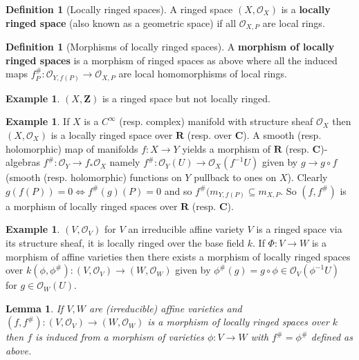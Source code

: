 \documentclass[10pt,]{book}
\newcommand{\terminology}[1]{\textbf{#1}}
\theoremstyle{plain}
\newtheorem{lemma}[theorem]{Lemma}
\theoremstyle{definition}
\newtheorem{definition}[theorem]{Definition}
\newtheorem{example}[theorem]{Example}
\newcommand{\CC}{\mathbf{C}}
\newcommand{\RR}{\mathbf{R}}
\newcommand{\ZZ}{\mathbf{Z}}
\newcommand{\cO}{\mathcal{O}}
\begin{document}
\begin{definition}[Locally ringed spaces]\label{definition-11}
A ringed space \((X, \cO_X)\) is a \terminology{locally ringed space} (also known as a geometric space) if all \(\cO_{X,P}\) are local rings.\end{definition}
\begin{definition}[Morphisms of locally ringed spaces]\label{definition-12}
A \terminology{morphism of locally ringed spaces} is a morphism of ringed spaces as above where all the induced maps \(f_P^\#\colon \cO_{Y,f(P)} \to \cO_{X,P}\) are local homomorphisms of local rings.\end{definition}
\begin{example}\label{example-7}
\((X,\ZZ)\) is a ringed space but not locally ringed.\end{example}
\begin{example}\label{example-8}
If \(X\) is a \(C^\infty\) (resp. complex) manifold with structure sheaf \(\cO_X\) then \((X, \cO_X)\) is a locally ringed space over \(\RR\) (resp. over \(\CC\)).
            A smooth (resp. holomorphic) map of manifolds \(f\colon X\to Y\) yields a morphism of \(\RR\) (resp. \(\CC\))-algebras \(f^\#\colon \cO_Y\to f_* \cO_X\) namely \(f^\#\colon\cO_Y(U) \to\cO_X(f^{-1}U)\) given by \(g\to g\circ f\) (smooth (resp. holomorphic) functions on \(Y\) pullback to ones on \(X\)).
            Clearly \(g(f(P)) = 0 \iff f^\#(g)(P) = 0\) and so \(f^\#(m_{Y,f(P)} \subseteq m_{X,P}\).
            So \((f,f^\#)\) is a morphism of locally ringed spaces over \(\RR\) (resp. \(\CC\)).
          \end{example}
\begin{example}\label{example-9}
\((V,\cO_V)\) for \(V\) an irreducible affine variety \(V\) is a ringed space via its structure sheaf, it is locally ringed over the base field \(k\).
            If \(\Phi\colon V \to W\) is a morphism of affine varieties then there exists a morphism of locally ringed spaces over \(k\)\((\phi, \phi^\#)\colon (V, \cO_V) \to (W, \cO_W)\) given by \(\phi^\#(g) = g\circ \phi \in \cO_V(\phi^{-1}U)\) for \(g\in\cO_W(U)\).
          \end{example}
\begin{lemma}\label{lemma-2}
If \(V,W\) are (irreducible) affine varieties and \((f,f^\#)\colon (V,\cO_V)\to (W,\cO_W)\) is a morphism of locally ringed spaces over \(k\) then \(f\) is induced from a morphism of varieties \(\phi\colon V\to W\) with \(f^\# = \phi^\#\) defined as above.\end{lemma}
\end{document}
